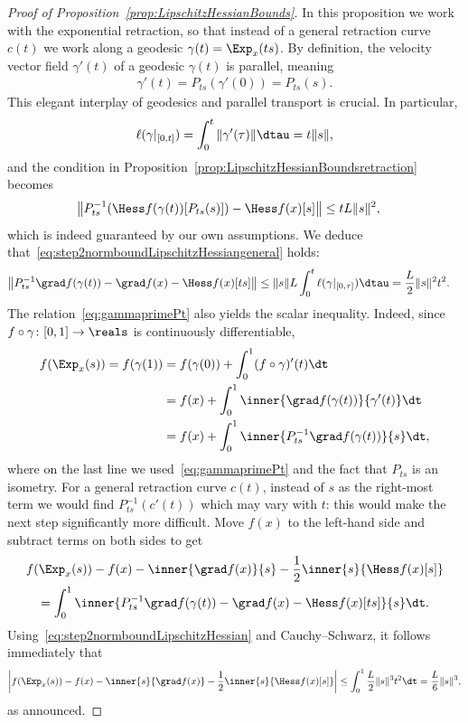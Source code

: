 \begin{proof}[Proof of Proposition~\ref{prop:LipschitzHessianBounds}]
	In this proposition we work with the exponential retraction, so that instead of a general retraction curve $c(t)$ we work along a geodesic $\gamma(t) = \Exp_x(ts)$. By definition, the velocity vector field $\gamma'(t)$ of a geodesic $\gamma(t)$ is parallel, meaning
	\begin{align}
		\gamma'(t) = P_{ts}(\gamma'(0)) = P_{ts}(s).
		\label{eq:gammaprimePt}
	\end{align}
	This elegant interplay of geodesics and parallel transport is crucial.
	In particular, 
	\begin{align*}
		 \ell(\gamma|_{[0, t]}) = \int_{0}^{t} \|\gamma'(\tau)\| \dtau = t \|s\|,
	\end{align*}
	and the condition in Proposition~\ref{prop:LipschitzHessianBoundsretraction} becomes
	\begin{align*}
		\left\| P_{t s}^{-1}\!\left(\Hess f(\gamma(t))[P_{ts}(s)]\right) - \Hess f(x)[s] \right\| & \leq t L \|s\|^2,
	\end{align*}
	which is indeed guaranteed by our own assumptions. We deduce that~\eqref{eq:step2normboundLipschitzHessiangeneral} holds:
	\begin{align}
		\left\| P_{ts}^{-1}\grad f(\gamma(t)) - \grad f(x) - \Hess f(x)[ts] \right\| & \leq \|s\| L \int_{0}^{t} \ell(\gamma|_{[0, \tau]}) \dtau = \frac{L}{2} \|s\|^2 t^2.
		\label{eq:step2normboundLipschitzHessian}
	\end{align}
	The relation~\eqref{eq:gammaprimePt} also yields the scalar inequality. Indeed, since $f \circ \gamma \colon [0, 1] \to \reals$ is continuously differentiable,
	\begin{align*}
	f(\Exp_x(s)) = f(\gamma(1)) & = f(\gamma(0)) + \int_{0}^{1} (f \circ \gamma)'(t) \dt \\
							& = f(x) + \int_{0}^{1} \inner{\grad f(\gamma(t))}{\gamma'(t)} \dt \\
							& = f(x) + \int_{0}^{1} \inner{P_{ts}^{-1}\grad f(\gamma(t))}{s} \dt,
	\end{align*}
	where on the last line we used~\eqref{eq:gammaprimePt} and the fact that $P_{ts}$ is an isometry.
	For a general retraction curve $c(t)$, instead of $s$ as the right-most term we would find $P_{ts}^{-1}(c'(t))$ which may vary with $t$: this would make the next step significantly more difficult.
	Move $f(x)$ to the left-hand side and subtract terms on both sides to get
	\begin{multline*}
		f(\Exp_x(s)) - f(x) - \inner{\grad f(x)}{s} - \frac{1}{2} \inner{s}{\Hess f(x)[s]} \\ = \int_{0}^{1} \inner{P_{ts}^{-1}\grad f(\gamma(t)) - \grad f(x) - \Hess f(x)[ts]}{s} \dt.
	\end{multline*}
	Using~\eqref{eq:step2normboundLipschitzHessian} and Cauchy--Schwarz, it follows immediately that
	\begin{align*}
	\left| f(\Exp_x(s)) - f(x) - \inner{s}{\grad f(x)} - \frac{1}{2} \inner{s}{\Hess f(x)[s]} \right| \leq \int_{0}^{1} \frac{L}{2} \|s\|^3 t^2 \dt = \frac{L}{6} \|s\|^3,
	\end{align*}
	as announced.
\end{proof}

